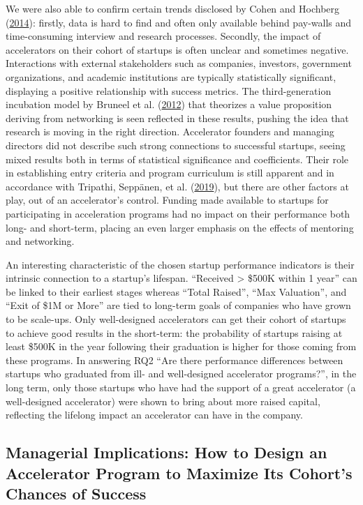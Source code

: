 \documentclass[
  12pt,
]{article}
\begin{document}
We were also able to confirm certain trends disclosed by Cohen and Hochberg (\protect\hyperlink{ref-cohen_accelerating_2014}{2014}): firstly, data is hard to find and often only available behind pay-walls and time-consuming interview and research processes. Secondly, the impact of accelerators on their cohort of startups is often unclear and sometimes negative. Interactions with external stakeholders such as companies, investors, government organizations, and academic institutions are typically statistically significant, displaying a positive relationship with success metrics. The third-generation incubation model by Bruneel et al. (\protect\hyperlink{ref-bruneel_evolution_2012}{2012}) that theorizes a value proposition deriving from networking is seen reflected in these results, pushing the idea that research is moving in the right direction. Accelerator founders and managing directors did not describe such strong connections to successful startups, seeing mixed results both in terms of statistical significance and coefficients. Their role in establishing entry criteria and program curriculum is still apparent and in accordance with Tripathi, Seppänen, et al. (\protect\hyperlink{ref-tripathi_insights_2019}{2019}), but there are other factors at play, out of an accelerator's control. Funding made available to startups for participating in acceleration programs had no impact on their performance both long- and short-term, placing an even larger emphasis on the effects of mentoring and networking.

An interesting characteristic of the chosen startup performance indicators is their intrinsic connection to a startup's lifespan. ``Received \textgreater{} \$500K within 1 year'' can be linked to their earliest stages whereas ``Total Raised'', ``Max Valuation'', and ``Exit of \$1M or More'' are tied to long-term goals of companies who have grown to be scale-ups. Only well-designed accelerators can get their cohort of startups to achieve good results in the short-term: the probability of startups raising at least \$500K in the year following their graduation is higher for those coming from these programs. In answering RQ2 ``Are there performance differences between startups who graduated from ill- and well-designed accelerator programs?'', in the long term, only those startups who have had the support of a great accelerator (a well-designed accelerator) were shown to bring about more raised capital, reflecting the lifelong impact an accelerator can have in the company.

\hypertarget{managerial-implications-how-to-design-an-accelerator-program-to-maximize-its-cohorts-chances-of-success}{%
\subsection{Managerial Implications: How to Design an Accelerator Program to Maximize Its Cohort's Chances of Success}\label{managerial-implications-how-to-design-an-accelerator-program-to-maximize-its-cohorts-chances-of-success}}
\end{document}
